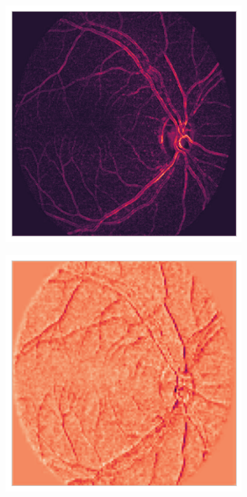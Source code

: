 \begin{figure}
     \begin{subfigure}[b]{0.19\textwidth}
         \centering
         \includegraphics[width=\textwidth, height=\textwidth]{figures/chapter6/features/10988_left/10988_left_0.png}
    \end{subfigure}
    \hfill
    \begin{subfigure}[b]{0.19\textwidth}
         \centering
         \includegraphics[width=\textwidth, height=\textwidth]{figures/chapter6/features/10988_left/10988_left_1.png}

\end{subfigure}
\end{figure}
